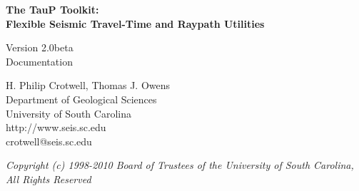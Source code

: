 
\begin{titlepage}
\begin{center}

\vspace{2in}

\LARGE
\textbf{
The TauP Toolkit: \\
Flexible Seismic Travel-Time and Raypath Utilities \\
}

\large
Version 2.0beta \\
Documentation 

\vspace{3in}

H. Philip Crotwell, Thomas J. Owens \\
Department of Geological Sciences \\
University of South Carolina \\
http://www.seis.sc.edu \\
crotwell@seis.sc.edu 

\vspace{3in}

\textit{
\normalsize 
Copyright (c) 1998-2010 Board of Trustees of the University of South Carolina, \\
All Rights Reserved
\normalsize}

\end{center}
\end{titlepage}

